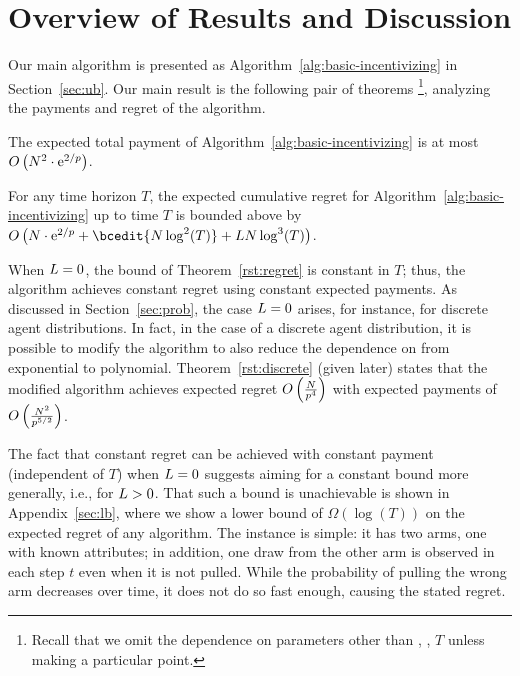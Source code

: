 \section{Overview of Results and Discussion}

Our main algorithm is presented as
Algorithm~\ref{alg:basic-incentivizing}
in Section~\ref{sec:ub}.
Our main result is the following pair of theorems%
\footnote{Recall that we omit the dependence on parameters other than
  \ARMNUM, \MinProb, $T$ unless making a particular point.},
analyzing the payments and regret of the algorithm.

\begin{theorem} \label{rst:budget}
The expected total payment of
Algorithm~\ref{alg:basic-incentivizing} is at most
$O \left(N^2 \cdot \mathrm{e}^{2/p} \right)$.
\end{theorem}

\begin{theorem} \label{rst:regret}
For any time horizon $T$, the expected cumulative regret for
Algorithm~\ref{alg:basic-incentivizing} up to time $T$ is bounded
above by 
    $O \left(\ARMNUM \cdot \e^{2/\MinProb} + \bcedit{\ARMNUM \log^2(T)}+ \TieDensity \ARMNUM \log^3(T) \right)$.
\end{theorem}

When $L = 0$, the bound of Theorem~\ref{rst:regret} is
constant in $T$;
thus, the algorithm achieves constant regret using constant
expected payments. 
As discussed in Section~\ref{sec:prob},
the case $L = 0$ arises, for instance, for
discrete agent distributions.
In fact, in the case of a discrete agent distribution,
it is possible to modify the algorithm to also
reduce the dependence on \MinProb from exponential to polynomial.
Theorem~\ref{rst:discrete} (given later) states that the modified
algorithm achieves expected regret
$O \left(\frac{N}{p^4} \right)$
with expected payments of
$O \left(\frac{N^2}{p^{5/2}} \right)$.

The fact that constant regret can be achieved with constant payment
(independent of $T$) when $L = 0$ suggests aiming for a
constant bound more generally, i.e., for $L > 0$.
That such a bound is unachievable is shown in Appendix~\ref{sec:lb},
where we show a lower bound of $\Omega(\log(T))$ on
the expected regret of any algorithm.
The instance is simple: it has two arms, one with known attributes; 
in addition, one draw from the other arm is observed in
each step $t$ even when it is not pulled.
While the probability of pulling the wrong arm decreases over time, it
does not do so fast enough, causing the stated regret.

